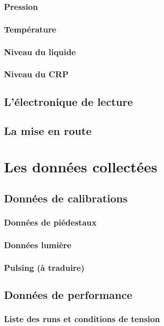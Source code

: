       \subsubsection{Pression}
      \subsubsection{Température}
      \subsubsection{Niveau du liquide}
      \subsubsection{Niveau du CRP}
    \subsection{L'électronique de lecture}
    \subsection{La mise en route}
        
    \section{Les données collectées}
    \subsection{Données de calibrations}
      \subsubsection{Données de piédestaux}
      \subsubsection{Données lumière}
      \subsubsection{Pulsing (à traduire)}
    \subsection{Données de performance}
      \subsubsection{Liste des runs et conditions de tension}
